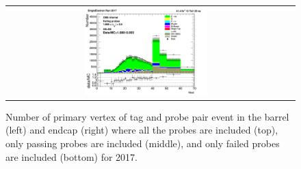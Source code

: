 \begin{figure}[htp]
\begin{center}
\begin{tabular}{cc}
      \includegraphics[width=0.45\textwidth]{figures/Zprime/2017/ScaleFactor/SameSign/nominal/stack_nVtx_Endcap_fail_PUW.png}
    \end{tabular}
    \caption{Number of primary vertex of tag and probe pair event in the barrel (left) and endcap (right) where all the probes are included (top), only passing probes are included (middle), and only failed probes are included (bottom) for 2017.}
    \label{fig:SS_nominal_PV_2017}
  \end{center}
\end{figure}

\clearpage

